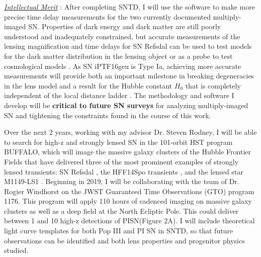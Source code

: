 \noindent\underline{\textit{Intellectual Merit}} : After completing SNTD, I
will use the software to make more precise time delay measurements for
the two currently documented multiply-imaged SN. Properties of dark
energy and dark matter are still poorly understood and inadequately
constrained, but accurate measurements of the lensing magnification
and time delays for SN Refsdal can be used to test models for the dark
matter distribution in the lensing
object \cite{Rodney:2015a,Rodney:2016} or as a probe to test
cosmological models \cite{Suyu:2014}. As SN iPTF16geu is Type Ia,
achieving more accurate measurements will provide both an important
milestone in breaking degeneracies in the lens model and a result for
the Hubble constant $H_0$ that is completely independent of the local
distance ladder \cite{Kolatt:1998,Oguri:2003b}. The methodology and
software I develop will be \textbf{critical to future SN surveys} for
analyzing multiply-imaged SN and tightening the constraints found in
the course of this work.

Over the next 2 years, working with my
advisor Dr. Steven Rodney, I will be able to search for high-z and
strongly lensed SN in the 101-orbit HST program BUFFALO, which will
image the massive galaxy clusters of the Hubble Frontier Fields that
have delivered three of the most prominent examples of strongly lensed
transients: SN Refsdal \cite{Kelly:2015a}, the HFF14Spo
transients \cite{Rodney:2017}, and the lensed star
M1149-LS1 \cite{Kelly:2017}. Beginning in 2019, I will be
collaborating with the team of Dr. Rogier Windhorst on the JWST
Guaranteed Time Observations (GTO) program 1176.  This program will
apply 110 hours of cadenced imaging on massive galaxy clusters as well
as a deep field at the North Ecliptic Pole.  This could deliver
between 1 and 10 high-z detections of PISN\cite{Souza:2013}(Figure
2A). I will include theoretical light curve templates for both Pop III
and PI SN in SNTD, so that future observations can be identified and
both lens properties and progenitor physics studied.

